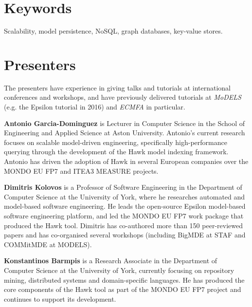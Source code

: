 \documentclass[conference]{IEEEtran}
\newcommand{\todo}[1]{{\color{red}#1}}
\begin{document}
\maketitle

\begin{abstract}

\end{abstract}



\section{Keywords}

Scalability, model persistence, NoSQL, graph databases, key-value stores.

\section{Presenters}

The presenters have experience in giving talks and tutorials at international
conferences and workshops, and have previously delivered tutorials at
\emph{MoDELS} (e.g. the Epsilon tutorial in 2016) and \emph{ECMFA} in particular.

\textbf{Antonio Garcia-Dominguez} is Lecturer in Computer Science in the School of Engineering and Applied Science at Aston University. Antonio's current research focuses on scalable model-driven engineering, specifically high-performance querying through the development of the Hawk model indexing framework. Antonio has driven the adoption of Hawk in several European companies over the MONDO EU FP7 and ITEA3 MEASURE projects.

\textbf{Dimitris Kolovos} is a Professor of Software Engineering in the Department of Computer Science at the University of York, where he researches automated and model-based software engineering. He leads the open-source Epsilon model-based software engineering platform, and led the MONDO EU FP7 work package that produced the Hawk tool. Dimitris has co-authored more than 150 peer-reviewed papers and has co-organised several workshops (including BigMDE at STAF and COMMitMDE at MODELS).

\textbf{Konstantinos Barmpis} %
is a Research Associate in the Department of Computer Science at the University of York, currently focusing on repository mining, distributed systems and domain-specific languages. He has produced the core components of the Hawk tool as part of the MONDO EU FP7 project and continues to support its development. 
\end{document}
